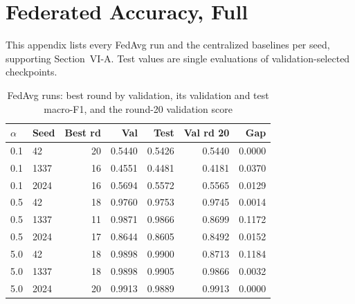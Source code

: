 \section{Federated Accuracy, Full}
\label{app:fedacc}
This appendix lists every FedAvg run and the centralized baselines per seed, supporting
Section~VI-A. Test values are single evaluations of validation-selected checkpoints.

\begin{table}[h]
\centering
\caption{FedAvg runs: best round by validation, its validation and test macro-F1, and the round-20 validation score} %
\label{tab:fedruns}
\footnotesize
\setlength{\tabcolsep}{3.5pt}
\begin{tabular}{@{}llrrrrr@{}}
\toprule
$\alpha$ & Seed & Best rd & Val & Test & Val rd 20 & Gap\\ %
\midrule
0.1 & 42 & 20 & 0.5440 & 0.5426 & 0.5440 & 0.0000\\ %
0.1 & 1337 & 16 & 0.4551 & 0.4481 & 0.4181 & 0.0370\\ %
0.1 & 2024 & 16 & 0.5694 & 0.5572 & 0.5565 & 0.0129\\ %
0.5 & 42 & 18 & 0.9760 & 0.9753 & 0.9745 & 0.0014\\ %
0.5 & 1337 & 11 & 0.9871 & 0.9866 & 0.8699 & 0.1172\\ %
0.5 & 2024 & 17 & 0.8644 & 0.8605 & 0.8492 & 0.0152\\ %
5.0 & 42 & 18 & 0.9898 & 0.9900 & 0.8713 & 0.1184\\ %
5.0 & 1337 & 18 & 0.9898 & 0.9905 & 0.9866 & 0.0032\\ %
5.0 & 2024 & 20 & 0.9913 & 0.9889 & 0.9913 & 0.0000\\ %
\bottomrule
\end{tabular}
\end{table}

